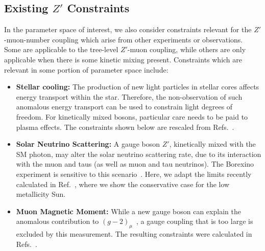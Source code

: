 \documentclass[11pt]{article}
\begin{document}
\subsection{Existing $Z'$ Constraints}
\label{sec:Zpconstraints}
In the parameter space of interest, we also consider constraints relevant for the $Z'$-muon-number coupling which arise from other experiments or observations. Some are applicable to the tree-level $Z'$-muon coupling, while others are only applicable when there is some kinetic mixing present. Constraints which are relevant in some portion of parameter space include:
\begin{itemize}
\item {\bf Stellar cooling:} The production of new light particles in stellar cores affects energy transport within the star. Therefore, the non-observation of such anomalous energy transport can be used to constrain light degrees of freedom. For kinetically mixed bosons, particular care needs to be paid to plasma effects. 
The constraints shown below are rescaled from Refs.~\cite{An:2013yfc,Hardy:2016kme}. 

\item {\bf Solar Neutrino Scattering:} A gauge boson $Z'$, kinetically mixed with the SM photon, may alter the solar neutrino scattering rate, due to its interaction with the muon and taus (as well as muon and tau neutrinos). The Borexino experiment is sensitive to this scenario~\cite{Harnik:2012ni,Laha:2013xua,Kamada:2015era,Amaral:2020tga}. Here, we adapt the limits recently calculated in Ref.~\cite{Amaral:2020tga}, where we show the conservative case for the low metallicity Sun.

\item {\bf Muon Magnetic Moment:} While a new gauge boson can explain the anomalous contribution to $(g-2)_\mu$~\cite{Czarnecki:2001pv}, a gauge coupling that is too large is excluded by this measurement. The resulting constraints were calculated in Refs.~\cite{Pospelov:2008zw,Escudero:2019gzq}.


\end{itemize}
\end{document}
